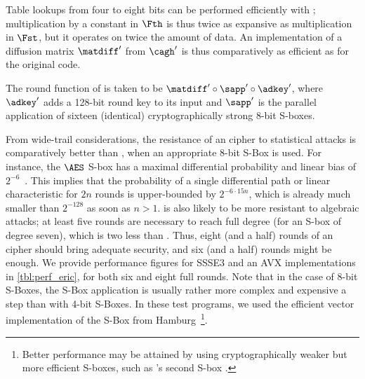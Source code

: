 Table lookups from four to eight bits can be performed efficiently with \pshufb; multiplication
by a constant in $\Fth$ is thus twice as expansive as multiplication in $\Fst$, but it operates
on twice the amount of data. An implementation of a diffusion matrix
$\matdiff'$ from $\cagh'$ is thus comparatively as efficient as for the original code. 

\medskip 

The round function of \eric is taken to be $\matdiff' \circ \sapp' \circ \adkey'$, where $\adkey'$ adds a
128-bit round key to its input and $\sapp'$ is the parallel application of sixteen (identical) cryptographically
strong 8-bit S-boxes.

From wide-trail considerations, the resistance of an \eric cipher to statistical attacks is comparatively better than \sam,
when an appropriate 8-bit S-Box is used.
For instance, the $\AES$ S-box has a maximal differential probability and linear bias of $2^{-6}$~\cite{aes}.
This implies that the probability of a single differential path or linear characteristic for $2n$ rounds
is upper-bounded by $2^{-6\cdot15 n}$, which is already much smaller than $2^{-128}$ as soon
as $n > 1$.
\eric is also likely to be more resistant to algebraic attacks; at least five rounds are necessary to reach
full degree (for an S-box of degree seven), which is two less than \sam.
Thus, eight (and a half) rounds of an \eric cipher should bring adequate security, and six (and a half) rounds might be enough.
We provide performance figures for SSSE3 and an AVX implementations in \autoref{tbl:perf_eric}, for both six and eight full rounds.
Note that in the case of 8-bit S-Boxes,
the S-Box application is usually rather more complex and expensive a step than with 4-bit S-Boxes. In these test programs, we used the efficient vector
implementation of the \AES{} S-Box from Hamburg~\cite{hamburg}\footnote{Better performance may be attained by using cryptographically
weaker but more efficient S-boxes, such as \whirlpool's second S-box \cite{whirlpool}.}.

